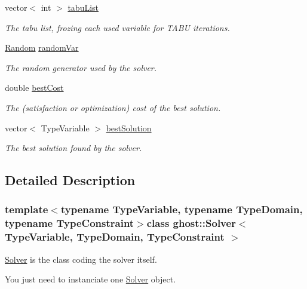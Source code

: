 \begin{DoxyCompactItemize}
vector$<$ int $>$ \hyperlink{classghost_1_1Solver_aa5c12894a6fbd524fb33906c8f3fbcae}{tabu\-List}
\begin{DoxyCompactList}\small\item\em The tabu list, frozing each used variable for T\-A\-B\-U iterations. \end{DoxyCompactList}\item 
\hyperlink{classghost_1_1Random}{Random} \hyperlink{classghost_1_1Solver_acec87a0a0adcc3a8d794a1ff84718201}{random\-Var}
\begin{DoxyCompactList}\small\item\em The random generator used by the solver. \end{DoxyCompactList}\item 
double \hyperlink{classghost_1_1Solver_a2fa5cf25d3417e3046aad3c1123320ed}{best\-Cost}
\begin{DoxyCompactList}\small\item\em The (satisfaction or optimization) cost of the best solution. \end{DoxyCompactList}\item 
vector$<$ Type\-Variable $>$ \hyperlink{classghost_1_1Solver_aa76ec90c418b23b261a0f3da63a9ee4a}{best\-Solution}
\begin{DoxyCompactList}\small\item\em The best solution found by the solver. \end{DoxyCompactList}\end{DoxyCompactItemize}


\subsection{Detailed Description}
\subsubsection*{template$<$typename Type\-Variable, typename Type\-Domain, typename Type\-Constraint$>$class ghost\-::\-Solver$<$ Type\-Variable, Type\-Domain, Type\-Constraint $>$}

\hyperlink{classghost_1_1Solver}{Solver} is the class coding the solver itself. 

You just need to instanciate one \hyperlink{classghost_1_1Solver}{Solver} object.

